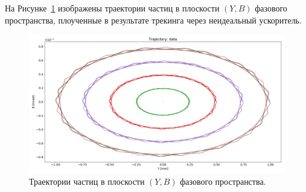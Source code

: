 На Рисунке~\ref{fig:yb_traj} изображены траектории частиц в плоскости $(Y,B)$ фазового пространства, плоученные в результате трекинга через неидеальный ускоритель.
\begin{figure}[h!]
	\centering
	\includegraphics[width=\linewidth]{images/decoh_sim/YB-PHASE_SPACE_IMPERFECT_UNOPT}
	\caption{Траектории частиц в плоскости $(Y,B)$ фазового пространства.\label{fig:yb_traj}} 
\end{figure}

